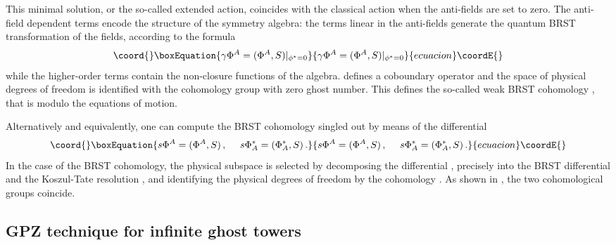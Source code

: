 \documentclass[a4paper,12pt]{article}
\begin{document}
This minimal solution, or the so-called extended action, coincides
with the classical action  when the anti-fields are set to zero. The
anti-field dependent terms encode the structure of the symmetry algebra:
the terms linear in the anti-fields generate the quantum BRST
transformation of the fields, according to the formula
\begin{equation}\coord{}\boxEquation{\label{omega}
  \gamma \Phi^A = (\Phi^A, S)|_{\phi^*=0}
}{\gamma \Phi^A = (\Phi^A, S)|_{\phi^*=0}
}{ecuacion}\coordE{}\end{equation}
while the higher-order terms contain the non-closure functions of the
algebra. \myHighlight{$\gamma$}\coordHE{} defines a coboundary operator and the space of physical 
degrees of freedom is identified with the cohomology group \coordHE{} 
with zero ghost number. This defines the so-called weak BRST cohomology \cite{henne_libro}, 
that is modulo the equations of motion.  

Alternatively and equivalently, one can compute the BRST cohomology 
singled out by means of the differential 
\begin{equation}\coord{}\boxEquation{\label{esse}
  s \Phi^A = (\Phi^A, S)\,,~~~~  s \Phi^*_A = (\Phi^*_A, S)\,. 
}{s \Phi^A = (\Phi^A, S)\,,~~~~  s \Phi^*_A = (\Phi^*_A, S)\,. 
}{ecuacion}\coordE{}\end{equation}
In the case of the BRST cohomology, the physical subspace is
selected by decomposing the differential \coordHE{},
precisely into the BRST differential \myHighlight{$\gamma$}\coordHE{} and the Koszul-Tate
resolution \myHighlight{$\delta$}\coordHE{}, and identifying the physical degrees of freedom
by the cohomology \coordHE{}. As shown in
\cite{anti_coho}, the two cohomological groups coincide.



\subsection{GPZ technique for infinite ghost towers}
\label{GPZ}
\end{document}
